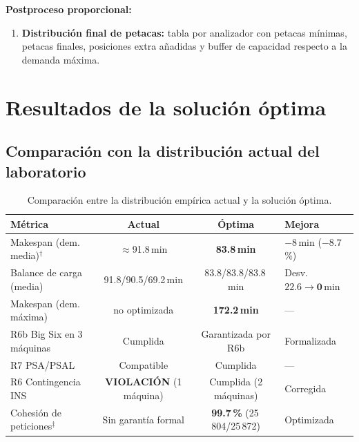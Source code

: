 \documentclass[12pt, a4paper]{article}
\begin{document}
\textbf{Postproceso proporcional:}
\begin{enumerate}[resume]
  \item \textbf{Distribución final de petacas:} tabla por analizador con petacas mínimas,
        petacas finales, posiciones extra añadidas y buffer de capacidad respecto a la
        demanda máxima.
\end{enumerate}

\clearpage
\section{Resultados de la solución óptima}

\subsection{Comparación con la distribución actual del laboratorio}

\begin{table}[H]
\centering
\caption{Comparación entre la distribución empírica actual y la solución óptima.}
\begin{tabularx}{\linewidth}{Xcc>{\raggedright\arraybackslash}X}
\toprule
\textbf{Métrica} & \textbf{Actual} & \textbf{Óptima} & \textbf{Mejora} \\
\midrule
Makespan (dem. media)$^\dagger$ & $\approx$91.8\,min & \textbf{83.8\,min} & $-8$\,min ($-8.7$\,\%) \\
Balance de carga (media) & 91.8/90.5/69.2\,min & 83.8/83.8/83.8\,min & Desv. $22.6 \to \mathbf{0}$\,min \\
Makespan (dem. máxima) & no optimizada & \textbf{172.2\,min} & --- \\
R6b Big Six en 3 máquinas & Cumplida & Garantizada por R6b & Formalizada \\
R7 PSA/PSAL & Compatible & Cumplida & --- \\
R6 Contingencia INS & \textbf{VIOLACIÓN} (1 máquina) & Cumplida (2 máquinas) & Corregida \\
Cohesión de peticiones$^\ddagger$ & Sin garantía formal & \textbf{99.7\,\%} (25\,804/25\,872) & Optimizada \\
\bottomrule
\end{tabularx}
\end{table}
\end{document}
